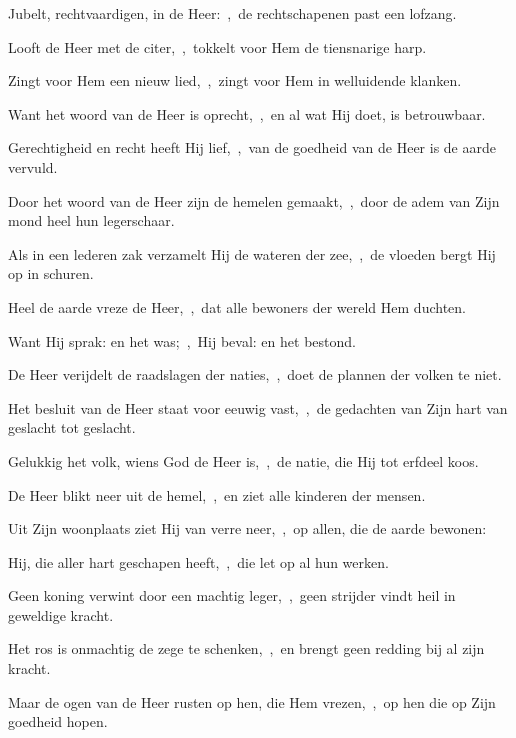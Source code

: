 \documentclass[12pt,twoside,a5paper]{article}
\begin{document}

\begin{halfparskip}
   Jubelt, rechtvaardigen, in de Heer:~\sep\ de rechtschapenen past een lofzang.


  Looft de Heer met de citer,~\sep\ tokkelt voor Hem de tiensnarige harp.

  Zingt voor Hem een nieuw lied,~\sep\ zingt voor Hem in welluidende klanken.

  Want het woord van de Heer is oprecht,~\sep\ en al wat Hij doet, is betrouwbaar.

  Gerechtigheid en recht heeft Hij lief,~\sep\ van de goedheid van de Heer is de aarde vervuld.

  Door het woord van de Heer zijn de hemelen gemaakt,~\sep\ door de adem van Zijn mond heel hun legerschaar.

  Als in een lederen zak verzamelt Hij de wateren der zee,~\sep\ de vloeden bergt Hij op in schuren.

  Heel de aarde vreze de Heer,~\sep\ dat alle bewoners der wereld Hem duchten.

  Want Hij sprak: en het was;~\sep\ Hij beval: en het bestond.

  De Heer verijdelt de raadslagen der naties,~\sep\ doet de plannen der volken te niet.

  Het besluit van de Heer staat voor eeuwig vast,~\sep\ de gedachten van Zijn hart van geslacht tot geslacht.

  Gelukkig het volk, wiens God de Heer is,~\sep\ de natie, die Hij tot erfdeel koos.

  De Heer blikt neer uit de hemel,~\sep\ en ziet alle kinderen der mensen.

  Uit Zijn woonplaats ziet Hij van verre neer,~\sep\ op allen, die de aarde bewonen:

  Hij, die aller hart geschapen heeft,~\sep\ die let op al hun werken.

  Geen koning verwint door een machtig leger,~\sep\ geen strijder vindt heil in geweldige kracht.

  Het ros is onmachtig de zege te schenken,~\sep\ en brengt geen redding bij al zijn kracht.

  Maar de ogen van de Heer rusten op hen, die Hem vrezen,~\sep\ op hen die op Zijn goedheid hopen.


\end{halfparskip}
\end{document}
